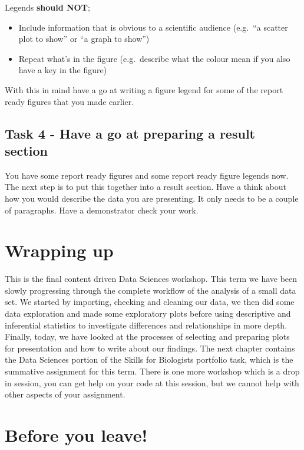 \documentclass[
]{book}
\providecommand{\tightlist}{%
  \setlength{\itemsep}{0pt}\setlength{\parskip}{0pt}}
\begin{document}
Legends \textbf{should NOT};

\begin{itemize}
\tightlist
\item
  Include information that is obvious to a scientific audience (e.g.~``a scatter plot to show'' or ``a graph to show'')
\item
  Repeat what's in the figure (e.g.~describe what the colour mean if you also have a key in the figure)
\end{itemize}

With this in mind have a go at writing a figure legend for some of the report ready figures that you made earlier.

\hypertarget{task-4---have-a-go-at-preparing-a-result-section}{%
\subsection{Task 4 - Have a go at preparing a result section}\label{task-4---have-a-go-at-preparing-a-result-section}}

You have some report ready figures and some report ready figure legends now. The next step is to put this together into a result section. Have a think about how you would describe the data you are presenting. It only needs to be a couple of paragraphs. Have a demonstrator check your work.

\hypertarget{wrapping-up-2}{%
\section{Wrapping up}\label{wrapping-up-2}}

This is the final content driven Data Sciences workshop. This term we have been slowly progressing through the complete workflow of the analysis of a small data set. We started by importing, checking and cleaning our data, we then did some data exploration and made some exploratory plots before using descriptive and inferential statistics to investigate differences and relationships in more depth. Finally, today, we have looked at the processes of selecting and preparing plots for presentation and how to write about our findings. The next chapter contains the Data Sciences portion of the Skills for Biologists portfolio task, which is the summative assignment for this term. There is one more workshop which is a drop in session, you can get help on your code at this session, but we cannot help with other aspects of your assignment.

\hypertarget{before-you-leave-9}{%
\section{Before you leave!}\label{before-you-leave-9}}
\end{document}
